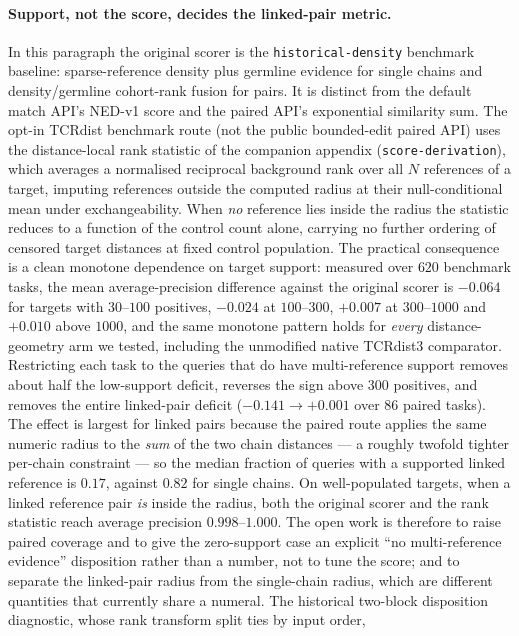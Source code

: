 \documentclass[11pt]{article}
\theoremstyle{oldplain}
\theoremstyle{oldrem}
\begin{document}
\paragraph{Support, not the score, decides the linked-pair metric.} In this paragraph the original scorer is the
\texttt{historical-density} benchmark baseline: sparse-reference density plus germline evidence
for single chains and density/germline cohort-rank fusion for pairs. It is distinct from the
default match API's NED-v1 score and the paired API's exponential similarity sum.
 The opt-in TCRdist benchmark route (not the public bounded-edit paired API) uses the distance-local rank
statistic of the companion appendix (\texttt{score-derivation}), which averages a normalised reciprocal
background rank over all $N$ references of a target, imputing references outside the computed radius
at their null-conditional mean under exchangeability. When \emph{no}
reference lies inside the radius the statistic reduces to a function of the control count alone,
carrying no further ordering of censored target distances at fixed control population. The practical consequence is a clean monotone dependence
on target support: measured over $620$ benchmark tasks, the mean average-precision difference
against the original scorer is $-0.064$ for targets with $30$--$100$ positives, $-0.024$ at
$100$--$300$, $+0.007$ at $300$--$1000$ and $+0.010$ above $1000$, and the same monotone pattern
holds for \emph{every} distance-geometry arm we tested, including the unmodified native TCRdist3
comparator. Restricting each task to the queries that do have multi-reference support removes about
half the low-support deficit, reverses the sign above $300$ positives, and removes the entire
linked-pair deficit ($-0.141\to+0.001$ over $86$ paired tasks). The effect is largest for linked
pairs because the paired route applies the same numeric radius to the \emph{sum} of the two chain
distances --- a roughly twofold tighter per-chain constraint --- so the median fraction of queries
with a supported linked reference is $0.17$, against $0.82$ for single chains. On well-populated
targets, when a linked reference pair \emph{is} inside the radius, both the original scorer and the
rank statistic reach average precision $0.998$--$1.000$. The open work is therefore to raise paired
coverage and to give the zero-support case an explicit ``no multi-reference evidence'' disposition
rather than a number, not to tune the score; and to separate the linked-pair radius from the
single-chain radius, which are different quantities that currently share a numeral. The historical two-block disposition diagnostic, whose rank transform split ties by input order,
\end{document}
